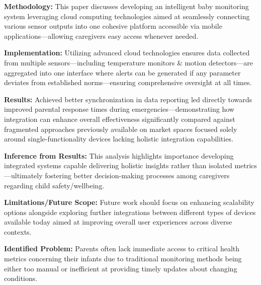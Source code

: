 \documentclass[12pt,a4paper]{report}
\begin{document}
\noindent\textbf{Methodology:} This paper discusses developing an intelligent baby monitoring system leveraging cloud computing technologies aimed at seamlessly connecting various sensor outputs into one cohesive platform accessible via mobile applications—allowing caregivers easy access whenever needed.

\setlength{\parskip}{1em}  %


\noindent\textbf{Implementation:} Utilizing advanced cloud technologies ensures data collected from multiple sensors—including temperature monitors \& motion detectors—are aggregated into one interface where alerts can be generated if any parameter deviates from established norms—ensuring comprehensive oversight at all times.
\setlength{\parskip}{1em}  %

\noindent\textbf{Results:} Achieved better synchronization in data reporting led directly towards improved parental response times during emergencies—demonstrating how integration can enhance overall effectiveness significantly compared against fragmented approaches previously available on market spaces focused solely around single-functionality devices lacking holistic integration capabilities.

\setlength{\parskip}{1em}  %


\noindent\textbf{Inference from Results:} This analysis highlights importance developing integrated systems capable delivering holistic insights rather than isolated metrics—ultimately fostering better decision-making processes among caregivers regarding child safety/wellbeing.


\setlength{\parskip}{1em}  %

\noindent\textbf{Limitations/Future Scope:} Future work should focus on enhancing scalability options alongside exploring further integrations between different types of devices available today aimed at improving overall user experiences across diverse contexts.
\setlength{\parskip}{1em}  %

\noindent\textbf{Identified Problem:} Parents often lack immediate access to critical health metrics concerning their infants due to traditional monitoring methods being either too manual or inefficient at providing timely updates about changing conditions\cite{aktacs2016real}.
\end{document}
